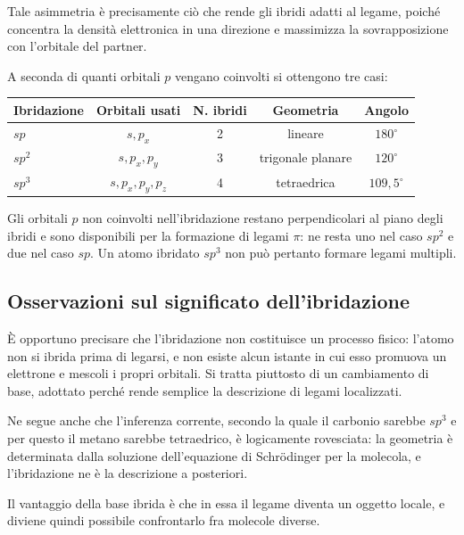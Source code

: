 Tale asimmetria è precisamente ciò che rende gli ibridi adatti al legame, poiché concentra la densità elettronica in una direzione e massimizza la sovrapposizione con l'orbitale del partner.

A seconda di quanti orbitali $p$ vengano coinvolti si ottengono tre casi:

\begin{center}
    \begin{tabular}{lcccc}
        \toprule
        Ibridazione & Orbitali usati & N. ibridi & Geometria & Angolo \\
        \midrule
        $sp$    & $s,p_x$           & 2 & lineare            & $180^\circ$ \\
        $sp^2$  & $s,p_x,p_y$       & 3 & trigonale planare  & $120^\circ$ \\
        $sp^3$  & $s,p_x,p_y,p_z$   & 4 & tetraedrica        & $109{,}5^\circ$ \\
        \bottomrule
    \end{tabular}
\end{center}

Gli orbitali $p$ non coinvolti nell'ibridazione restano perpendicolari al piano degli ibridi e sono disponibili per la formazione di legami $\pi$: ne resta uno nel caso $sp^2$ e due nel caso $sp$. Un atomo ibridato $sp^3$ non può pertanto formare legami multipli.

\subsection{Osservazioni sul significato dell'ibridazione}

È opportuno precisare che l'ibridazione non costituisce un processo fisico: l'atomo non si ibrida prima di legarsi, e non esiste alcun istante in cui esso promuova un elettrone e mescoli i propri orbitali. 
Si tratta piuttosto di un cambiamento di base, adottato perché rende semplice la descrizione di legami localizzati.

Ne segue anche che l'inferenza corrente, secondo la quale il carbonio sarebbe $sp^3$ e per questo il metano sarebbe tetraedrico, è logicamente rovesciata: la geometria è determinata dalla soluzione dell'equazione di Schrödinger per la molecola, e l'ibridazione ne è la descrizione a posteriori.

Il vantaggio della base ibrida è che in essa il legame diventa un oggetto locale, e diviene quindi possibile confrontarlo fra molecole diverse.

\newpage

